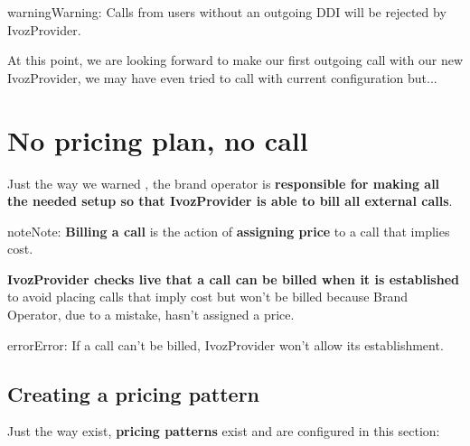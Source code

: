 \documentclass[letterpaper,10pt,english]{sphinxmanual}
\begin{document}
\begin{notice}{warning}{Warning:}
Calls from users without an outgoing DDI will be rejected by IvozProvider.
\end{notice}

At this point, we are looking forward to make our first outgoing call with our
new IvozProvider, we may have even tried to call with current configuration but...


\section{No pricing plan, no call}
\label{external_outgoing_calls/noplan_nocall:noplan-nocall}\label{external_outgoing_calls/noplan_nocall::doc}\label{external_outgoing_calls/noplan_nocall:no-pricing-plan-no-call}
Just the way we warned {\hyperref[operation_roles/index:brand\string-responsibilities]{}}, the brand operator is \textbf{responsible for making all the
needed setup so that IvozProvider is able to bill all external calls}.

\begin{notice}{note}{Note:}
\textbf{Billing a call} is the action of \textbf{assigning price} to a call that implies
cost.
\end{notice}

\textbf{IvozProvider checks live that a call can be billed when it is established} to avoid
placing calls that imply cost but won't be billed because Brand Operator, due to
a mistake, hasn't assigned a price.

\begin{notice}{error}{Error:}
If a call can't be billed, IvozProvider won't allow its establishment.
\end{notice}


\subsection{Creating a pricing pattern}
\label{external_outgoing_calls/noplan_nocall:price-pattern}\label{external_outgoing_calls/noplan_nocall:creating-a-pricing-pattern}
Just the way {\hyperref[external_outgoing_calls/call_types:target\string-patterns]{}} exist, \textbf{pricing patterns}
exist and are configured in this section:

\noindent{}
\end{document}
